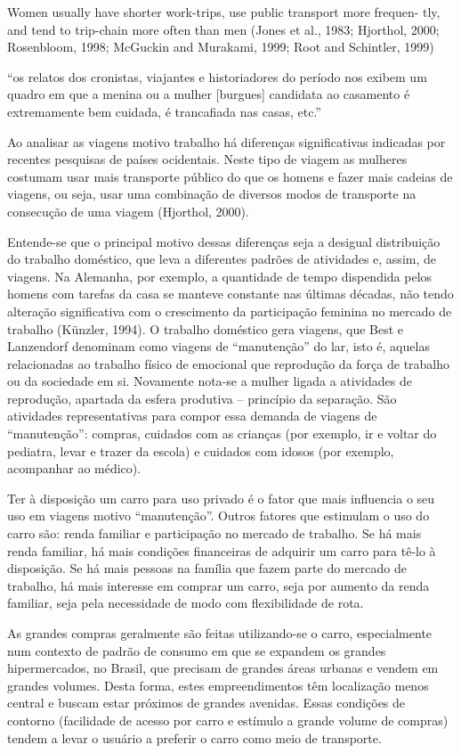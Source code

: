 Women usually have shorter work-trips, use public transport more frequen- tly, and tend to trip-chain more often than men (Jones et al., 1983; Hjorthol, 2000; Rosenbloom, 1998; McGuckin and Murakami, 1999; Root and Schintler, 1999)

``os relatos dos cronistas, viajantes e historiadores do período nos exibem um quadro em que a menina ou a mulher [burgues] candidata ao casamento é extremamente bem cuidada, é trancafiada nas casas, etc.''\cite{DINCAO2012}

Ao analisar as viagens motivo trabalho há diferenças significativas indicadas por recentes pesquisas de países ocidentais. Neste tipo de viagem as mulheres costumam usar mais transporte público do que os homens e fazer mais cadeias de viagens, ou seja, usar uma combinação de diversos modos de transporte na consecução de uma viagem (Hjorthol, 2000).

Entende-se que o principal motivo dessas diferenças seja a desigual distribuição do trabalho doméstico, que leva a diferentes padrões de atividades e, assim, de viagens. Na Alemanha, por exemplo, a quantidade de tempo dispendida pelos homens com tarefas da casa se manteve constante nas últimas décadas, não tendo alteração significativa com o crescimento da participação feminina no mercado de trabalho (Künzler, 1994). O trabalho doméstico gera viagens, que Best e Lanzendorf denominam como viagens de “manutenção” do lar, isto é, aquelas relacionadas ao trabalho físico de emocional que reprodução da força de trabalho ou da sociedade em si. Novamente nota-se a mulher ligada a atividades de reprodução, apartada da esfera produtiva – princípio da separação. São atividades representativas para compor essa demanda de viagens de “manutenção”: compras, cuidados com as crianças (por exemplo, ir e voltar do pediatra, levar e trazer da escola) e cuidados com idosos (por exemplo, acompanhar ao médico).

Ter à disposição um carro para uso privado é o fator que mais influencia o seu uso em viagens motivo “manutenção”. Outros fatores que estimulam o uso do carro são: renda familiar e participação no mercado de trabalho. Se há mais renda familiar, há mais condições financeiras de adquirir um carro para tê-lo à disposição. Se há mais pessoas na família que fazem parte do mercado de trabalho, há mais interesse em comprar um carro, seja por aumento da renda familiar, seja pela necessidade de modo com flexibilidade de rota.

As grandes compras geralmente são feitas utilizando-se o carro, especialmente num contexto de padrão de consumo em que se expandem os grandes hipermercados, no Brasil, que precisam de grandes áreas urbanas e vendem em grandes volumes. Desta forma, estes empreendimentos têm localização menos central e buscam estar próximos de grandes avenidas. Essas condições de contorno (facilidade de acesso por carro e estímulo a grande volume de compras) tendem a levar o usuário a preferir o carro como meio de transporte.

